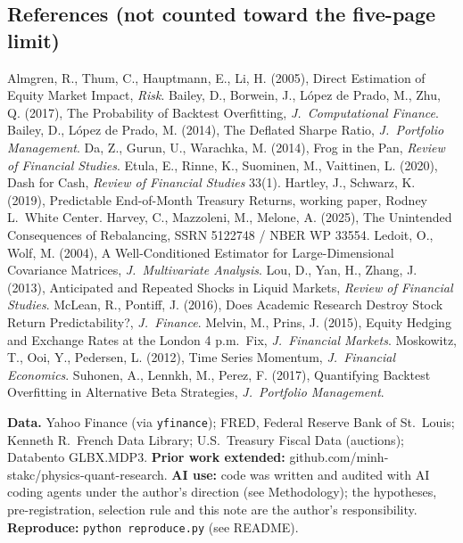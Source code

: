 \documentclass[11pt]{article}
\newcommand{\sect}[1]{\vspace{1pt}\section*{#1}\vspace{-4pt}}
\begin{document}
\clearpage
\begin{small}
\sect{References (not counted toward the five-page limit)}
Almgren, R., Thum, C., Hauptmann, E., Li, H. (2005), Direct Estimation of Equity Market Impact, \emph{Risk}.
Bailey, D., Borwein, J., L\'opez de Prado, M., Zhu, Q. (2017), The Probability of Backtest Overfitting, \emph{J.\ Computational Finance}.
Bailey, D., L\'opez de Prado, M. (2014), The Deflated Sharpe Ratio, \emph{J.\ Portfolio Management}.
Da, Z., Gurun, U., Warachka, M. (2014), Frog in the Pan, \emph{Review of Financial Studies}.
Etula, E., Rinne, K., Suominen, M., Vaittinen, L. (2020), Dash for Cash, \emph{Review of Financial Studies} 33(1).
Hartley, J., Schwarz, K. (2019), Predictable End-of-Month Treasury Returns, working paper, Rodney L.\ White Center.
Harvey, C., Mazzoleni, M., Melone, A. (2025), The Unintended Consequences of Rebalancing, SSRN 5122748 / NBER WP 33554.
Ledoit, O., Wolf, M. (2004), A Well-Conditioned Estimator for Large-Dimensional Covariance Matrices, \emph{J.\ Multivariate Analysis}.
Lou, D., Yan, H., Zhang, J. (2013), Anticipated and Repeated Shocks in Liquid Markets, \emph{Review of Financial Studies}.
McLean, R., Pontiff, J. (2016), Does Academic Research Destroy Stock Return Predictability?, \emph{J.\ Finance}.
Melvin, M., Prins, J. (2015), Equity Hedging and Exchange Rates at the London 4 p.m.\ Fix, \emph{J.\ Financial Markets}.
Moskowitz, T., Ooi, Y., Pedersen, L. (2012), Time Series Momentum, \emph{J.\ Financial Economics}.
Suhonen, A., Lennkh, M., Perez, F. (2017), Quantifying Backtest Overfitting in Alternative Beta Strategies, \emph{J.\ Portfolio Management}.

\textbf{Data.} Yahoo Finance (via \texttt{yfinance}); FRED, Federal Reserve Bank of St.\ Louis; Kenneth R.\ French Data Library; U.S.\ Treasury Fiscal Data (auctions); Databento GLBX.MDP3. \textbf{Prior work extended:} github.com/minh-stakc/physics-quant-research. \textbf{AI use:} code was written and audited with AI coding agents under the author's direction (see Methodology); the hypotheses, pre-registration, selection rule and this note are the author's responsibility. \textbf{Reproduce:} \texttt{python reproduce.py} (see README).
\end{small}
\end{document}

